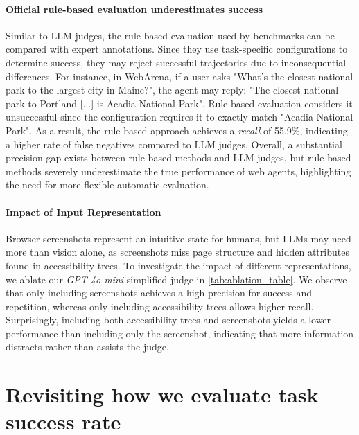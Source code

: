 \documentclass{article} %
\begin{document}
\paragraph{Official rule-based evaluation underestimates success}
Similar to LLM judges, the rule-based evaluation used by benchmarks can be compared with expert annotations.
Since they use task-specific configurations to determine success, they may reject successful trajectories due to inconsequential differences. For instance, in WebArena, if a user asks "What's the closest national park to the largest city in Maine?", the agent may reply: "The closest national park to Portland [...] is Acadia National Park". Rule-based evaluation considers it unsuccessful since the configuration requires it to exactly match "Acadia National Park". As a result, the rule-based approach achieves a \textit{recall} of 55.9\%, indicating a higher rate of false negatives compared to LLM judges. 
Overall, a substantial precision gap exists between rule-based methods and LLM judges, but rule-based methods severely underestimate the true performance of web agents, highlighting the need for more flexible automatic evaluation.



\paragraph{Impact of Input Representation}
Browser screenshots represent an intuitive state for humans, but LLMs may need more than vision alone, as screenshots miss page structure and hidden attributes found in accessibility trees. To investigate the impact of different representations, we ablate our \textit{GPT-4o-mini} simplified judge in \cref{tab:ablation_table}. We observe that only including screenshots achieves a high precision for success and repetition, whereas only including accessibility trees allows higher recall. Surprisingly, including both accessibility trees and screenshots yields a lower performance than including only the screenshot, indicating that more information distracts rather than assists the judge.




\section{Revisiting how we evaluate task success rate}
\label{sec:revisisting_task_success_rate}
\end{document}
